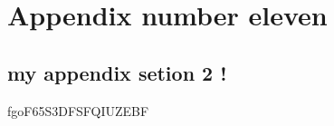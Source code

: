 
\chapter{Appendix number eleven}
\label{appendix:toto}
\section{my appendix setion 2 !}

fgoF65S3DFSFQIUZEBF